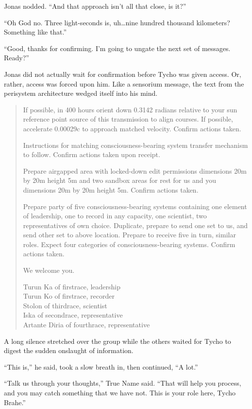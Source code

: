 Jonas nodded. ``And that approach isn't all that close, is it?''

``Oh God no. Three light-seconds is, uh\ldots nine hundred thousand kilometers? Something like that.''

``Good, thanks for confirming. I'm going to ungate the next set of messages. Ready?''

Jonas did not actually wait for confirmation before Tycho was given access. Or, rather, access was forced upon him. Like a sensorium message, the text from the perisystem architecture wedged itself into his mind.

\begin{quote}
If possible, in 400 hours orient down 0.3142 radians relative to your sun reference point source of this transmission to align courses. If possible, accelerate 0.00029c to approach matched velocity. Confirm actions taken.

Instructions for matching consciousness-bearing system transfer mechanism to follow. Confirm actions taken upon receipt.

Prepare airgapped area with locked-down edit permissions dimensions 20m by 20m height 5m and two sandbox areas for rest for us and you dimensions 20m by 20m height 5m. Confirm actions taken.

Prepare party of five consciousness-bearing systems containing one element of leadership, one to record in any capacity, one scientist, two representatives of own choice. Duplicate, prepare to send one set to us, and send other set to above location. Prepare to receive five in turn, similar roles. Expect four categories of consciousness-bearing systems. Confirm actions taken.

We welcome you.

Turun Ka of firstrace, leadership\\
Turun Ko of firstrace, recorder\\
Stolon of thirdrace, scientist\\
Iska of secondrace, representative\\
Artante Diria of fourthrace, representative
\end{quote}

A long silence stretched over the group while the others waited for Tycho to digest the sudden onslaught of information.

``This is,'' he said, took a slow breath in, then continued, ``A lot.''

``Talk us through your thoughts,'' True Name said. ``That will help you process, and you may catch something that we have not. This is your role here, Tycho Brahe.''

